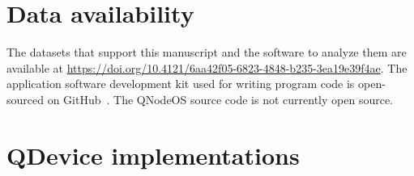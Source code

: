 
\iffullchapters



\section{Data availability}
The datasets that support this manuscript and the software to analyze them are available at \url{https://doi.org/10.4121/6aa42f05-6823-4848-b235-3ea19e39f4ae}. The application software development kit used for writing program code is open-sourced on GitHub~\cite{netqasm_sdk}. The QNodeOS source code is not currently open source.


\clearpage

\clearpage
\section{QDevice implementations}


\clearpage

\clearpage


\clearpage

% 
\clearpage

\fi

\begin{xstretch}
\printbibliography[heading=subbibintoc,title={References},notcategory=noprint]
\end{xstretch}